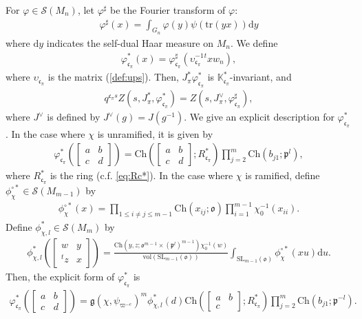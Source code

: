 \documentclass[11pt]{amsart}
\newcommand\Vp{\varpi}%
\newcommand\vp{\varphi}%
\newcommand\oo{\mathfrak{o}}
\newcommand\p{{\mathfrak{p}}}
\newcommand\cf{{\mathfrak{c}}}
\newcommand\gf{\mathfrak{g}}
\newcommand\dr{\mathrm{d}}
\newcommand\K{{\mathbb{K}}}
\newcommand\Ss{{\mathscr{S}}}
\newcommand\1{\mathbf{1}}
\newcommand\tr{\mathrm{tr}}
\newcommand\SL{{\mathrm{SL}}}
\newcommand\tm{\times}
\newcommand\Ch{{\mathrm{Ch}}}%
\newcommand\vol{{\mathrm{vol}}}
\numberwithin{equation}{section}
\begin{document}
For $\vp \in \Ss(M_n)$, let $\vp^\sharp$ be the Fourier transform of $\vp$: 
\begin{align*}
\vp^\sharp(x) = \int_{G_n} \vp(y)\psi(\tr(yx)) \dr y
\end{align*} 
where $\dr y$ indicates the self-dual Haar measure on $M_n$.
We define
\begin{align*}
\vp_{\cf_\pi}^*(x) = \vp_{\cf_\pi}^{\sharp}(\upsilon_{\cf_\pi}^{-1} {}^t x w_n), 
\end{align*} 
where $\upsilon_{\cf_\pi}$ is the matrix (\ref{def:ups}).
Then, $J_\pi^*\vp_{\cf_\pi}^*$ is $\K_{\cf_\pi}^*$-invariant, and
\begin{align}
q^{\cf_\pi s}Z(s,J_\pi^*,\vp_{\cf_\pi}^*) = Z(s,J_\pi^\vee, \vp_{\cf_\pi}^\sharp), \label{eq:vpcf}
\end{align}  
where $J^\vee$ is defined by $J^\vee(g) = J(g^{-1})$.
We give an explicit description for $\vp_{\cf_\pi}^*$.
In the case where $\chi$ is unramified, it is given by
\begin{align*}
\vp_{\cf_\pi}^*(\begin{bmatrix}
a & b  \\
c& d
\end{bmatrix}) = \Ch(\begin{bmatrix}
a & b \\
c& d
\end{bmatrix};R_{\cf_\pi}^*)\prod_{j=2}^{m}\Ch(b_{j1}; \p^{l}),
\end{align*} 
where $R_{\cf_\pi}^*$ is the ring (c.f. \ref{eq:Rc*}).
In the case where $\chi$ is ramified, define $\phi_\chi^{\circ *} \in \Ss(M_{m-1})$ by
\begin{align*}
\phi_\chi^{\circ*}(x) = \prod_{1 \le i \neq j \le m-1}\Ch(x_{ij};\oo) \prod_{i=1}^{m-1} \chi_0^{-1}(x_{ii}).
\end{align*} 
Define $\phi_{\chi,l}^* \in \Ss(M_{m})$ by
\begin{align*}
\phi_{\chi,l}^*(\begin{bmatrix}
w &  y \\
{}^tz & x
\end{bmatrix}) = \frac{\Ch(y, z; \oo^{m-1} \tm (\p^{l})^{m-1}) \chi_0^{-1}(w)}{\vol(\SL_{m-1}(\oo))} \int_{\SL_{m-1}(\oo)}\phi_\chi^{\circ*}(x  u) \dr u. 
\end{align*} 
Then, the explicit form of $\vp_{\cf_\pi}^*$ is 
\begin{align*}
\vp_{\cf_\pi}^*(\begin{bmatrix}
a & b  \\
c& d
\end{bmatrix}) = \gf(\chi,\psi_{\Vp^{-e}})^{m}\phi_{\chi,l}^*(d) \Ch(\begin{bmatrix}
a & b \\
c& 
\end{bmatrix};R_{\cf_\pi}^*)\prod_{j=2}^{m}\Ch(b_{j1}; \p^{-l}).
\end{align*} 
\end{document}
